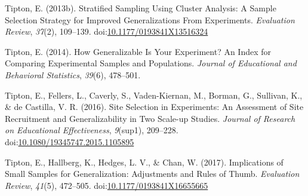 \documentclass[man,floatsintext]{apa6}
\begin{document}
\leavevmode\hypertarget{ref-tiptonStratifiedSamplingUsing2013}{}%
Tipton, E. (2013b). Stratified Sampling Using Cluster Analysis: A Sample Selection Strategy for Improved Generalizations From Experiments. \emph{Evaluation Review}, \emph{37}(2), 109--139. doi:\href{https://doi.org/10.1177/0193841X13516324}{10.1177/0193841X13516324}

\leavevmode\hypertarget{ref-tiptonHowGeneralizableYour2014}{}%
Tipton, E. (2014). How Generalizable Is Your Experiment? An Index for Comparing Experimental Samples and Populations. \emph{Journal of Educational and Behavioral Statistics}, \emph{39}(6), 478--501.

\leavevmode\hypertarget{ref-tiptonSiteSelectionExperiments2016}{}%
Tipton, E., Fellers, L., Caverly, S., Vaden-Kiernan, M., Borman, G., Sullivan, K., \& de Castilla, V. R. (2016). Site Selection in Experiments: An Assessment of Site Recruitment and Generalizability in Two Scale-up Studies. \emph{Journal of Research on Educational Effectiveness}, \emph{9}(sup1), 209--228. doi:\href{https://doi.org/10.1080/19345747.2015.1105895}{10.1080/19345747.2015.1105895}

\leavevmode\hypertarget{ref-tiptonImplicationsSmallSamples2017}{}%
Tipton, E., Hallberg, K., Hedges, L. V., \& Chan, W. (2017). Implications of Small Samples for Generalization: Adjustments and Rules of Thumb. \emph{Evaluation Review}, \emph{41}(5), 472--505. doi:\href{https://doi.org/10.1177/0193841X16655665}{10.1177/0193841X16655665}

\endgroup
\end{document}
